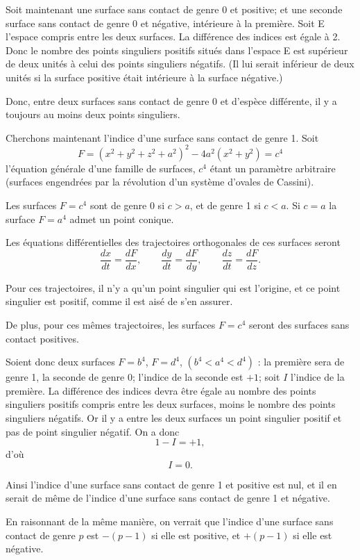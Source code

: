 \documentclass[11pt]{article}
\begin{document}
Soit maintenant une surface sans contact de genre 0 et positive; et une seconde surface sans contact de genre 0 et négative, intérieure à la première. Soit E l’espace compris entre les deux surfaces. La différence des indices est égale à 2. Donc le nombre des points singuliers positifs situés dans l’espace E est supérieur de deux unités à celui des points singuliers négatifs. (Il lui serait inférieur de deux unités si la surface positive était intérieure à la surface négative.)

Donc, entre deux surfaces sans contact de genre 0 et d’espèce différente, il y a toujours au moins deux points singuliers.

Cherchons maintenant l’indice d’une surface sans contact de genre 1. Soit
\[
F=(x^2+y^2+z^2+a^2)^2-4a^2(x^2+y^2)=c^4
\]
l’équation générale d’une famille de surfaces, $c^4$ étant un paramètre arbitraire (surfaces engendrées par la révolution d’un système d’ovales de Cassini).

Les surfaces $F=c^4$ sont de genre 0 si $c>a$, et de genre 1 si $c<a$. Si $c=a$ la surface $F=a^4$ admet un point conique.

Les équations différentielles des trajectoires orthogonales de ces surfaces seront
\[
\frac{dx}{dt}=\frac{dF}{dx},
\qquad
\frac{dy}{dt}=\frac{dF}{dy},
\qquad
\frac{dz}{dt}=\frac{dF}{dz}.
\]

Pour ces trajectoires, il n’y a qu’un point singulier qui est l’origine, et ce point singulier est positif, comme il est aisé de s’en assurer.

De plus, pour ces mêmes trajectoires, les surfaces $F=c^4$ seront des surfaces sans contact positives.

Soient donc deux surfaces $F=b^4$, $F=d^4$, $(b^4<a^4<d^4)$ : la première sera de genre 1, la seconde de genre 0; l’indice de la seconde est $+1$; soit $I$ l’indice de la première. La différence des indices devra être égale au nombre des points singuliers positifs compris entre les deux surfaces, moins le nombre des points singuliers négatifs. Or il y a entre les deux surfaces un point singulier positif et pas de point singulier négatif. On a donc
\[
1-I=+1,
\]
d’où
\[
I=0.
\]

Ainsi l’indice d’une surface sans contact de genre 1 et positive est nul, et il en serait de même de l’indice d’une surface sans contact de genre 1 et négative.

En raisonnant de la même manière, on verrait que l’indice d’une surface sans contact de genre $p$ est $-(p-1)$ si elle est positive, et $+(p-1)$ si elle est négative.
\end{document}

